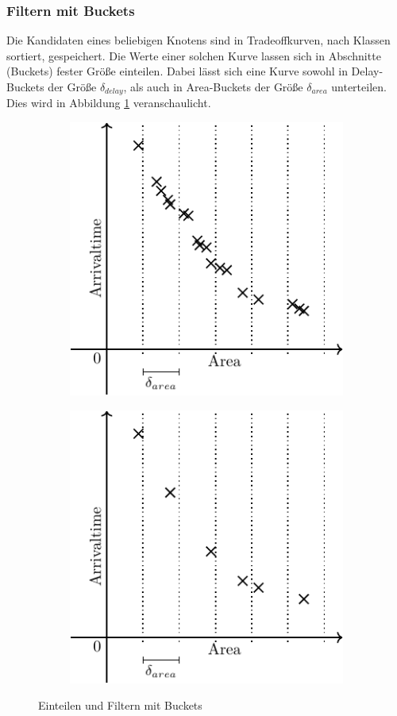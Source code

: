 \documentclass[11pt, a4paper, german]{article}
\begin{document}
\subsubsection{Filtern mit Buckets}
\label{subsubsec:filtern}
Die Kandidaten eines beliebigen Knotens sind in Tradeoffkurven, nach Klassen sortiert, gespeichert. Die Werte einer solchen Kurve lassen sich in Abschnitte (Buckets) fester Größe einteilen. Dabei lässt sich eine Kurve sowohl in Delay-Buckets  der Größe $\delta_{delay}$, als auch in Area-Buckets der Größe $\delta_{area}$ unterteilen. Dies wird in Abbildung \ref{bild:tradeoff_kurven_filtern} veranschaulicht.\\
\begin{figure}[h]
\centering
\begin{subfigure}{.5\textwidth}
  \centering
  \includegraphics[width=.7\linewidth]{pictures/compiled/tradeoff_kurve_buckets}
\end{subfigure}%
\begin{subfigure}{.5\textwidth}
  \centering
  \includegraphics[width=.7\linewidth]{pictures/compiled/tradeoff_kurve_filtered}
\end{subfigure}
\caption{Einteilen und Filtern mit Buckets}
\label{bild:tradeoff_kurven_filtern}
\end{figure}
\end{document}
